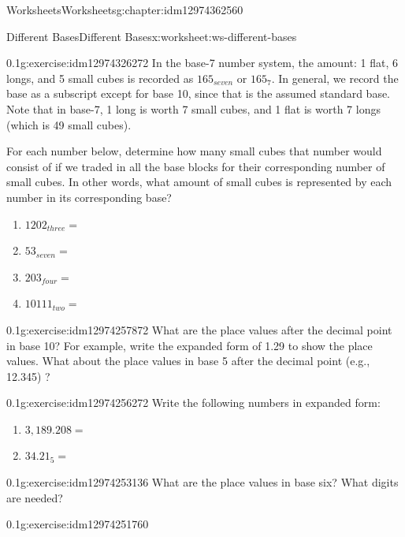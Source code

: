 \documentclass[twoside,11pt,]{book}
\begin{document}
\begin{chapterptx}{Worksheets}{}{Worksheets}{}{}{g:chapter:idm12974362560}
%
\begin{worksheet-section-numberless}{Different Bases}{}{Different Bases}{}{}{x:worksheet:ws-different-bases}
\begin{divisionexercise}{1}{}{0.1}{g:exercise:idm12974326272}%
In the base-7 number system, the amount: 1 flat, 6 longs, and 5 small cubes is recorded as \(165_{seven}\) or \(165_7\). In general, we record the base as a subscript except for base 10, since that is the assumed standard base.  Note that in base-7, 1 long is worth 7 small cubes, and 1 flat is worth 7 longs (which is 49 small cubes).%
\par
For each number below, determine how many small cubes that number would consist of if we traded in all the base blocks for their corresponding number of small cubes.  In other words, what amount of small cubes is represented by each number in its corresponding base?%
%
\begin{enumerate}[label=(\alph*)]
\item{}\(1202_{three}   = \)%
\item{}\(53_{seven}       = \)%
\item{}\(203_{four}       = \)%
\item{}\(10111_{two}       = \)%
\end{enumerate}
\end{divisionexercise}%
\begin{divisionexercise}{2}{}{0.1}{g:exercise:idm12974257872}%
What are the place values after the decimal point in base 10? For example, write the expanded form of 1.29 to show the place values. What about the place values in base 5 after the decimal point (e.g., 12.345) ?%
\end{divisionexercise}%
\begin{divisionexercise}{3}{}{0.1}{g:exercise:idm12974256272}%
Write the following numbers in expanded form:%
%
\begin{enumerate}[label=(\alph*)]
\item{}\(3,189.208 = \)%
\item{}\(34.21_5      = \)%
\end{enumerate}
\end{divisionexercise}%
\begin{divisionexercise}{4}{}{0.1}{g:exercise:idm12974253136}%
What are the place values in base six?  What digits are needed?%
\end{divisionexercise}%
\begin{divisionexercise}{5}{}{0.1}{g:exercise:idm12974251760}%

\end{divisionexercise}
\end{worksheet-section-numberless}
\end{chapterptx}
\end{document}
